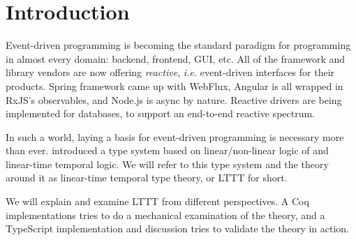 \chapter{Introduction}\label{chap:introduction}

Event-driven programming is becoming the standard paradigm for programming in almost every domain: backend, frontend, GUI, etc. All of the framework and library vendors are now offering \textit{reactive}, \textit{i.e.} event-driven interfaces for their products. Spring framework came up with WebFlux, Angular is all wrapped in RxJS's observables, and Node.js is async by nature. Reactive drivers are being implemented for databases, to support an end-to-end reactive spectrum.

In such a world, laying a basis for event-driven programming is necessary more than ever. \cite{Paykin2016TheEO} introduced a type system based on linear/non-linear logic of \cite{DBLP:conf/csl/Benton94} and linear-time temporal logic. We will refer to this type system and the theory around it as linear-time temporal type theory, or LTTT for short.

We will explain and examine LTTT from different perspectives. A Coq implementations tries to do a mechanical examination of the theory, and a TypeScript implementation and discussion tries to validate the theory in action.


